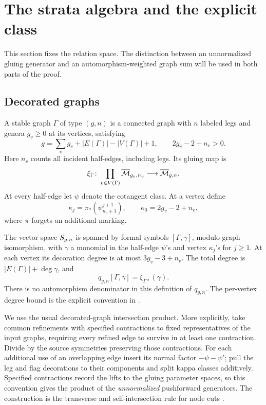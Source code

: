 \section{The strata algebra and the explicit class}\label{sec:strata}

This section fixes the relation space. The distinction between an
unnormalized gluing generator and an automorphism-weighted graph sum
will be used in both parts of the proof.

\subsection{Decorated graphs}

A stable graph \(\Gamma\) of type \((g,n)\) is a connected graph with
\(n\) labeled legs and genera \(g_v\geq0\) at its vertices, satisfying
\[
g=\sum_{v}g_v+|E(\Gamma)|-|V(\Gamma)|+1,
\qquad 2g_v-2+n_v>0.
\]
Here \(n_v\) counts all incident half-edges, including legs. Its gluing
map is
\[
\xi_\Gamma\colon\prod_{v\in V(\Gamma)}
\overline{\mathcal M}_{g_v,n_v}\longrightarrow\overline{\mathcal M}_{g,n}.
\]
At every half-edge let \(\psi\) denote the cotangent class. At a vertex
define
\[
\kappa_j=\pi_*(\psi_{n_v+1}^{j+1}),\qquad
\kappa_0=2g_v-2+n_v,
\]
where \(\pi\) forgets an additional marking.

The vector space \(S_{g,n}\) is spanned by formal symbols
\([\Gamma,\gamma]\), modulo graph isomorphism, with \(\gamma\) a monomial
in the half-edge \(\psi\)'s and vertex \(\kappa_j\)'s for \(j\geq1\).
At each vertex its decoration degree is at most \(3g_v-3+n_v\).
The total degree is \(|E(\Gamma)|+\deg\gamma\), and
\[
q_{g,n}[\Gamma,\gamma]=\xi_{\Gamma*}(\gamma).
\]
There is no automorphism denominator in this definition of \(q_{g,n}\).
The per-vertex degree bound is the explicit convention in
\cite[Section~0.3]{PPZ}.

We use the usual decorated-graph intersection product. More explicitly,
take common refinements with specified contractions to fixed
representatives of the input graphs, requiring every refined edge to
survive in at least one contraction. Divide by the source symmetries
preserving those contractions. For each additional use of an overlapping
edge insert its normal factor \(-\psi-\psi'\); pull the leg and flag
decorations to their components and split kappa classes additively.
Specified contractions record the lifts to the gluing parameter spaces,
so this convention gives the product of the \emph{unnormalized}
pushforward generators. The construction is the transverse and
self-intersection rule for node cuts
\cite[Appendix~A, Proposition~9 and Equation~(11)]{GraberPandharipande2003}.

